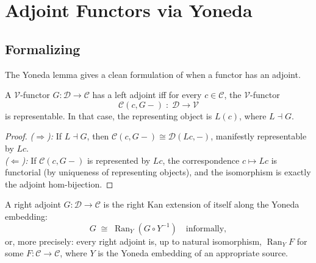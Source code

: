 \section{Adjoint Functors via Yoneda}
\label{sec:adjoints-via-yoneda}

\subsection{Formalizing}

The Yoneda lemma gives a clean formulation of when a functor has an adjoint.

\begin{theorem}
\label{thm:adjoint-as-rep}
A $\mathcal{V}$-functor $G : \mathcal{D} \to \mathcal{C}$ has a left adjoint
iff for every $c \in \mathcal{C}$, the $\mathcal{V}$-functor
\begin{equation*}
  \mathcal{C}(c, G-) \;:\; \mathcal{D} \to \mathcal{V}
\end{equation*}
is representable. In that case, the representing object is $L(c)$, where
$L \dashv G$.
\end{theorem}

\begin{proof}
\emph{($\Rightarrow$):} If $L \dashv G$, then $\mathcal{C}(c, G-) \cong
\mathcal{D}(L c, -)$, manifestly representable by $L c$. \\
\emph{($\Leftarrow$):} If $\mathcal{C}(c, G-)$ is represented by $L c$, the
correspondence $c \mapsto L c$ is functorial (by uniqueness of representing
objects), and the isomorphism is exactly the adjoint hom-bijection.
\end{proof}

\begin{corollary}
\label{cor:adjoint-as-ran}
A right adjoint $G : \mathcal{D} \to \mathcal{C}$ is the right Kan extension
of itself along the Yoneda embedding:
\begin{equation*}
  G \;\cong\; \operatorname{Ran}_Y (G \circ Y^{-1}) \quad\text{informally},
\end{equation*}
or, more precisely: every right adjoint is, up to natural isomorphism,
$\operatorname{Ran}_Y F$ for some $F : \mathcal{C} \to \mathcal{C}$, where
$Y$ is the Yoneda embedding of an appropriate source.
\end{corollary}

